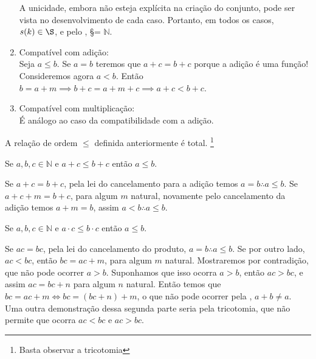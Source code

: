 \documentclass[../main.tex]{subfiles}
\begin{document}
\begin{dem}
\begin{enumerate}[label=(\roman*)]
        A unicidade, embora não esteja explícita na criação do conjunto, pode ser vista no desenvolvimento de cada caso.
        Portanto, em todos os casos, $s(k) \in \S$, e pelo , \S = $\mathbb{N}$.
        
        \item Compatível com adição: \\
        Seja $a \leq b$. Se $a = b$ teremos que $a+c = b+c$ porque a adição é uma função! 
        Consideremos agora $a < b$. Então $b = a + m \implies b+c = a+m+c \implies a+c < b+c$.
        \item Compatível com multiplicação: \\
        É análogo ao caso da compatibilidade com a adição.
     \end{enumerate}
\end{dem}

\begin{corol}\label{nat-coro-tric}
    A relação de ordem $\leq$ definida anteriormente é total. \footnote{Basta observar a tricotomia}
\end{corol}

\begin{prop}
    Se $a,b,c \in \mathbb{N}$ e $a + c \leq b + c$ então $a \leq b$.
\end{prop}
\begin{dem}
    Se $a + c = b + c$, pela lei do cancelamento para a adição temos $a=b \therefore a \leq b$.
    Se $a + c + m = b + c$, para algum $m$ natural, novamente pelo cancelamento da adição temos $a+m = b$, assim $a < b \therefore a \leq b$.
\end{dem}
\begin{prop}
    Se $a,b,c \in \mathbb{N}$ e $a \cdot c \leq b \cdot c$ então $a \leq b$.
\end{prop}
\begin{dem}
    Se $ac = bc$, pela lei do cancelamento do produto, $a=b \therefore a \leq b$.
    Se por outro lado, $ac < bc$, então $bc = ac + m$, para algum $m$ natural. Mostraremos por contradição, que não pode ocorrer $a > b$.
    Suponhamos que isso ocorra $a > b$, então $ac > bc$, e assim $ac = bc + n$ para algum $n$ natural. Então temos que 
    $bc = ac + m \iff bc = (bc + n) + m$, o que não pode ocorrer pela , $a+b \neq a$. Uma outra demonstração dessa segunda parte seria pela tricotomia, que não permite que ocorra $ac < bc $ e $ac > bc$.
\end{dem}
\end{document}
